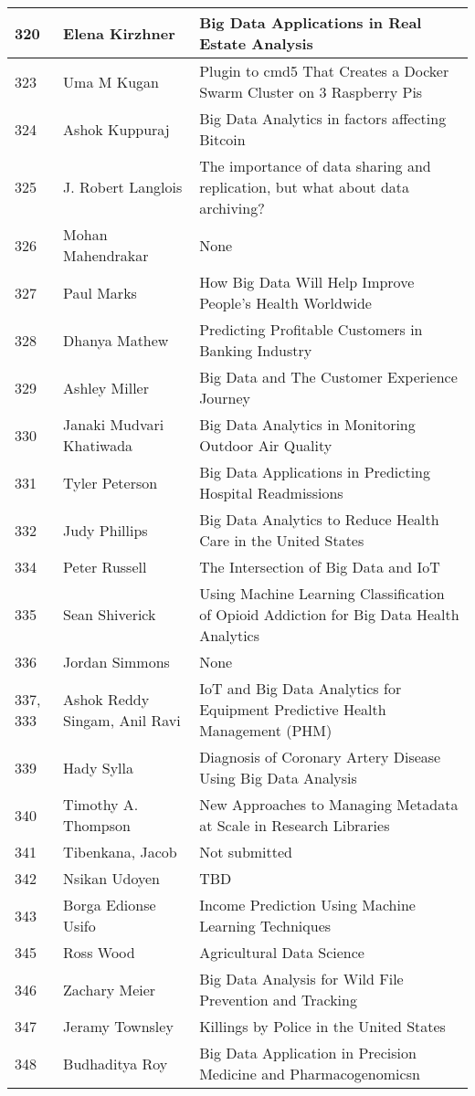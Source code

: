 \documentclass[12pt]{book}
\begin{document}
\begin{footnotesize}
\begin{longtable}{|p{1cm}p{5cm}p{9cm}|}
\hline
320 & Elena Kirzhner & Big Data Applications in Real Estate Analysis  \\
\hline
323 & Uma M Kugan & Plugin to cmd5 That Creates a Docker Swarm Cluster on 3 Raspberry Pis  \\
\hline
324 & Ashok Kuppuraj & Big Data Analytics in factors affecting Bitcoin  \\
\hline
325 & J. Robert Langlois & The importance of data sharing and replication, but what about data archiving?
  \\
\hline
326 & Mohan Mahendrakar & None  \\
\hline
327 & Paul Marks & How Big Data Will Help Improve People's Health Worldwide  \\
\hline
328 & Dhanya Mathew & Predicting Profitable Customers in Banking Industry  \\
\hline
329 & Ashley Miller & Big Data and The Customer Experience Journey  \\
\hline
330 & Janaki Mudvari Khatiwada & Big Data Analytics in Monitoring Outdoor Air Quality  \\
\hline
331 & Tyler Peterson & Big Data Applications in Predicting Hospital Readmissions  \\
\hline
332 & Judy Phillips & Big Data Analytics to Reduce Health Care in the United States  \\
\hline
334 & Peter Russell & The Intersection of Big Data and IoT  \\
\hline
335 & Sean Shiverick & Using Machine Learning Classification of Opioid Addiction for Big Data Health Analytics
  \\
\hline
336 & Jordan Simmons & None  \\
\hline
337, 333 & Ashok Reddy Singam, Anil Ravi & IoT and Big Data Analytics for Equipment Predictive Health Management (PHM)
  \\
\hline
339 & Hady Sylla & Diagnosis of Coronary Artery Disease Using Big Data Analysis  \\
\hline
340 & Timothy A. Thompson & New Approaches to Managing Metadata at Scale in Research Libraries
  \\
\hline
341 & Tibenkana, Jacob & Not submitted  \\
\hline
342 & Nsikan Udoyen & TBD  \\
\hline
343 & Borga Edionse Usifo & Income Prediction Using Machine Learning Techniques  \\
\hline
345 & Ross Wood & Agricultural Data Science  \\
\hline
346 & Zachary Meier & Big Data Analysis for Wild File Prevention and Tracking  \\
\hline
347 & Jeramy Townsley & Killings by Police in the United States  \\
\hline
348 & Budhaditya Roy & Big Data Application in Precision Medicine and Pharmacogenomicsn  \\
\hline
\end{longtable}
\end{footnotesize}
\newpage
\end{document}
